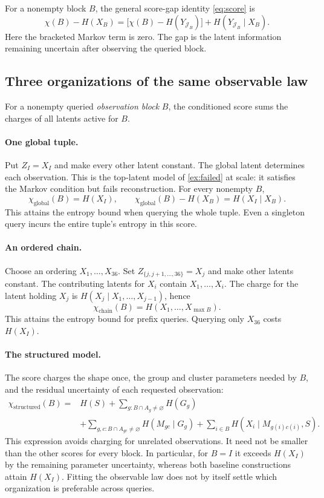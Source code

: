 \documentclass[11pt]{article}
\begin{document}
For a nonempty block $B$, the general score-gap identity \eqref{eq:score} is
\[
 \chi(B)-H(X_B)
 =\bigl[\chi(B)-H(Y_{\mathcal J_B})\bigr]
   +H(Y_{\mathcal J_B}\mid X_B).
\]
Here the bracketed Markov term is zero. The gap is the latent information
remaining uncertain after observing the queried block.

\subsection{Three organizations of the same observable law}
For a nonempty queried \emph{observation block} $B$, the conditioned score
sums the charges of all latents active for $B$.

\paragraph{One global tuple.}
Put $Z_I=X_I$ and make every other latent constant. The global latent determines
each observation. This is the top-latent model of \cref{ex:failed} at scale: it
satisfies the Markov condition but fails reconstruction. For every nonempty $B$,
\[
 \chi_{\mathrm{global}}(B)=H(X_I),\qquad
 \chi_{\mathrm{global}}(B)-H(X_B)=H(X_I\mid X_B).
\]
This attains the entropy bound when querying the whole tuple. Even a singleton
query incurs the entire tuple's entropy in this score.

\paragraph{An ordered chain.}
Choose an ordering $X_1,\ldots,X_{36}$. Set
$Z_{\{j,j+1,\ldots,36\}}=X_j$ and make other latents constant. The contributing
latents for $X_i$ contain $X_1,\ldots,X_i$. The charge for the latent holding $X_j$ is
$H(X_j\mid X_1,\ldots,X_{j-1})$, hence
\[
 \chi_{\mathrm{chain}}(B)=H(X_1,\ldots,X_{\max B}).
\]
This attains the entropy bound for prefix queries. Querying only $X_{36}$ costs
$H(X_I)$.

\paragraph{The structured model.}
The score charges the shape once, the group and cluster parameters needed by
$B$, and the residual uncertainty of each requested observation:
\[
\begin{aligned}
 \chi_{\mathrm{structured}}(B)={}&H(S)
 +\sum_{g:B\cap A_g\ne\varnothing}H(G_g)\\
 &+\sum_{g,c:B\cap A_{gc}\ne\varnothing}H(M_{gc}\mid G_g)
 +\sum_{i\in B}H(X_i\mid M_{g(i)c(i)},S).
\end{aligned}
\]
This expression avoids charging for unrelated observations. It need not be
smaller than the other scores for every block. In particular, for $B=I$ it
exceeds $H(X_I)$ by the remaining parameter uncertainty, whereas both baseline
constructions attain $H(X_I)$. Fitting the observable law does not by itself
settle which organization is preferable across queries.
\end{document}

